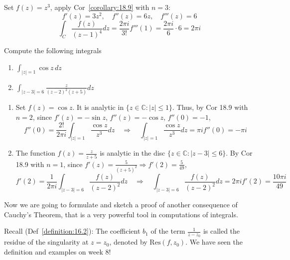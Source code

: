     \begin{soln}
      Set $f(z) = z^3$, apply Cor~\ref{corollary:18.9} with $n=3$:
        \[
            f'(z) = 3z^2, \quad f''(z) = 6z, \quad f'''(z) = 6
            \]
            \[
                \int_C \frac{f(z)}{(z-1)^4} dz = \frac{2\pi i}{3!} f'''(1) = \frac{2\pi i}{6} \cdot 6 = 2\pi i
                \]
                
            \end{soln}
        
\begin{example}\label{example:20.5}
    Compute the following integrals
                \begin{enumerate}
                    \item[a)] $\int_{|z|=1} \cos z \, dz$
                    \item[b)] $\int_{|z-3|=6} \frac{z}{(z-2)^2(z+5)} dz$
                \end{enumerate}
            \end{example}
                
\begin{soln}
\begin{enumerate}
                    \item[a)] Set $f(z) = \cos z$. It is analytic in $\{z \in \mathbb{C}: |z| \le 1\}$. Thus, by Cor 18.9 with $n=2$, since $f'(z) = -\sin z$, $f''(z) = -\cos z$, $f''(0) = -1$,
                    \[
                        f''(0) = \frac{2!}{2\pi i} \int_{|z|=1} \frac{\cos z}{z^3} dz \quad \Rightarrow \quad \int_{|z|=1} \frac{\cos z}{z^3} dz = \pi i f''(0) = -\pi i
                        \]
                        \item[b)] The function $f(z) = \frac{z}{z+5}$ is analytic in the disc $\{z \in \mathbb{C}: |z-3| \le 6\}$. By Cor 18.9 with $n=1$, since $f'(z) = \frac{5}{(z+5)^2} \Rightarrow f'(2) = \frac{5}{49}$,
                        \[
                            f'(2) = \frac{1}{2\pi i} \int_{|z-3|=6} \frac{f(z)}{(z-2)^2} dz \quad \Rightarrow \quad \int_{|z-3|=6} \frac{f(z)}{(z-2)^2} dz = 2\pi i f'(2) = \frac{10\pi i}{49}
                            \]
                        \end{enumerate}
                    \end{soln}

Now we are going to formulate and sketch a proof of another consequence of Cauchy's Theorem, that is a very powerful tool in computations of integrals.

Recall (Def~\ref{definition:16.2}): The coefficient $b_1$ of the term $\frac{1}{z-z_0}$ is called the residue of the singularity at $z=z_0$, denoted by $\text{Res}(f, z_0)$. We have seen the definition and examples on week 8!

